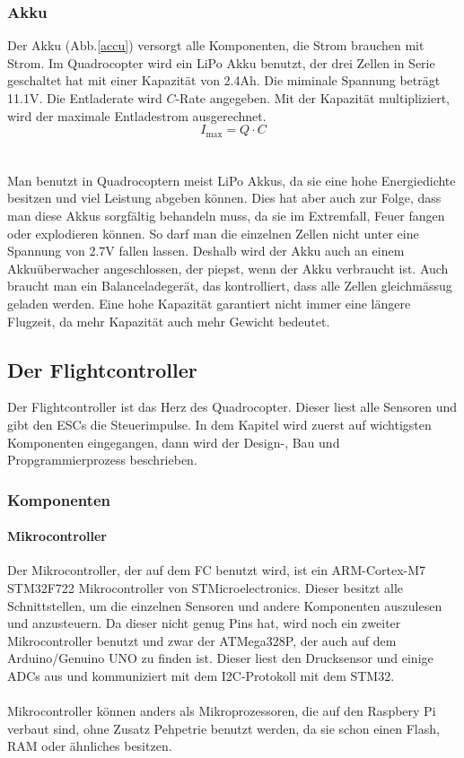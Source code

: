 \documentclass[12pt,a4paper, ngerman]{article}
\begin{document}
\subsubsection{Akku}
Der Akku (Abb.\ref{accu}) versorgt alle Komponenten, die Strom brauchen mit Strom. Im Quadrocopter wird ein LiPo Akku benutzt, der drei Zellen in Serie geschaltet hat mit einer Kapazität von 2.4Ah. Die miminale Spannung beträgt 11.1V. Die Entladerate wird $C$-Rate angegeben. Mit der Kapazität multipliziert, wird der maximale Entladestrom ausgerechnet\cite{website:fpvracing.ch_Mult_Komp}.
\begin{equation}
I_{\text{max}}=Q\cdot C
\end{equation}\\ \\
Man benutzt in Quadrocoptern meist LiPo Akkus, da sie eine hohe Energiedichte besitzen und viel Leistung abgeben können. Dies hat aber auch zur Folge, dass man diese Akkus sorgfältig behandeln muss, da sie im Extremfall, Feuer fangen oder explodieren können. So darf man die einzelnen Zellen nicht unter eine Spannung von 2.7V fallen lassen. Deshalb wird der Akku auch an einem Akkuüberwacher angeschlossen, der piepst, wenn der Akku verbraucht ist. Auch braucht man ein Balanceladegerät, das kontrolliert, dass alle Zellen gleichmässug geladen werden. Eine hohe Kapazität garantiert nicht immer eine längere Flugzeit, da mehr Kapazität auch mehr Gewicht bedeutet\cite{website:fpvracing.ch_Mult_Komp}.
\newpage

\subsection{Der Flightcontroller}
Der Flightcontroller ist das Herz des Quadrocopter. Dieser liest alle Sensoren und gibt den ESCs die Steuerimpulse. In dem Kapitel wird zuerst auf wichtigsten Komponenten eingegangen, dann wird der Design-, Bau und Propgrammierprozess beschrieben.
\subsubsection{Komponenten}
\paragraph{Mikrocontroller}
Der Mikrocontroller, der auf dem FC benutzt wird, ist ein ARM-Cortex-M7 STM32F722 Mikrocontroller von STMicroelectronics. Dieser besitzt alle Schnittstellen, um die einzelnen Sensoren und andere Komponenten auszulesen und anzusteuern. Da dieser nicht genug Pins hat, wird noch ein zweiter Mikrocontroller benutzt und zwar der ATMega328P, der auch auf dem Arduino/Genuino UNO zu finden ist\cite{website:Arduino}. Dieser liest den Drucksensor und einige ADCs aus und kommuniziert mit dem I2C-Protokoll mit dem STM32. \\ \\
Mikrocontroller können anders als Mikroprozessoren, die auf den Raspbery Pi verbaut sind, ohne Zusatz Pehpetrie benutzt werden, da sie schon einen Flash, RAM oder ähnliches besitzen\cite{website:MPUvsMCU}. 
\end{document}
